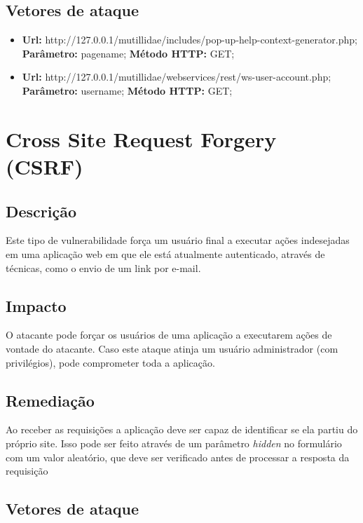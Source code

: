 \documentclass{ufscThesis}
\newcommand{\+}{\discretionary{\mbox{${\bm\cdot}\mkern-1mu$}}{}{}}
\renewcommand\+{\discretionary{}{}{}}
\begin{document}
\subsection{Vetores de ataque}

\begin{itemize}
\item \textbf{Url:} http://127.0.0.1/mutillidae/includes/pop-up-help-context-generator.php; \textbf{Parâmetro:} pagename; \textbf{Método HTTP:} GET;
\item \textbf{Url:} http://127.0.0.1/mutillidae/webservices/rest/ws-user-account.php; \textbf{Parâmetro:} username; \textbf{Método HTTP:} GET;
\end{itemize}

\section{Cross Site Request Forgery (CSRF)}

\subsection{Descrição}

Este tipo de vulnerabilidade força um usuário final a executar ações indesejadas em uma aplicação web em que ele está atualmente autenticado, através de técnicas, como o envio de um link por e-mail.

\subsection{Impacto}

O atacante pode forçar os usuários de uma aplicação a executarem ações de vontade do atacante. Caso este ataque atinja um usuário administrador (com privilégios), pode comprometer toda a aplicação.

\subsection{Remediação}

Ao receber as requisições a aplicação deve ser capaz de identificar se ela partiu do próprio site. Isso pode ser feito através de um parâmetro \emph{hidden} no formulário com um valor aleatório, que deve ser verificado antes de processar a resposta da requisição

\subsection{Vetores de ataque}
\end{document}
